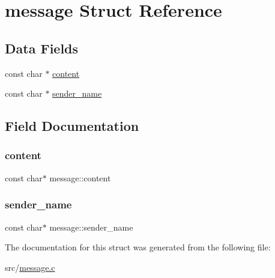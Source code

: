\hypertarget{structmessage}{}\section{message Struct Reference}
\label{structmessage}
\subsection*{Data Fields}
\begin{DoxyCompactItemize}
\item 
const char $\ast$ \hyperlink{structmessage_ad3b965525fe62cb25162084d97a3f0ff}{content}
\item 
const char $\ast$ \hyperlink{structmessage_a93d4525b657c15744e45ca9504840000}{sender\+\_\+name}
\end{DoxyCompactItemize}


\subsection{Field Documentation}
\mbox{\label{structmessage_ad3b965525fe62cb25162084d97a3f0ff}} 
\subsubsection{\texorpdfstring{content}{content}}
{\footnotesize\ttfamily const char$\ast$ message\+::content}

\mbox{\label{structmessage_a93d4525b657c15744e45ca9504840000}} 
\subsubsection{\texorpdfstring{sender\+\_\+name}{sender\_name}}
{\footnotesize\ttfamily const char$\ast$ message\+::sender\+\_\+name}



The documentation for this struct was generated from the following file\+:\begin{DoxyCompactItemize}
\item 
src/\hyperlink{message_8c}{message.\+c}\end{DoxyCompactItemize}
